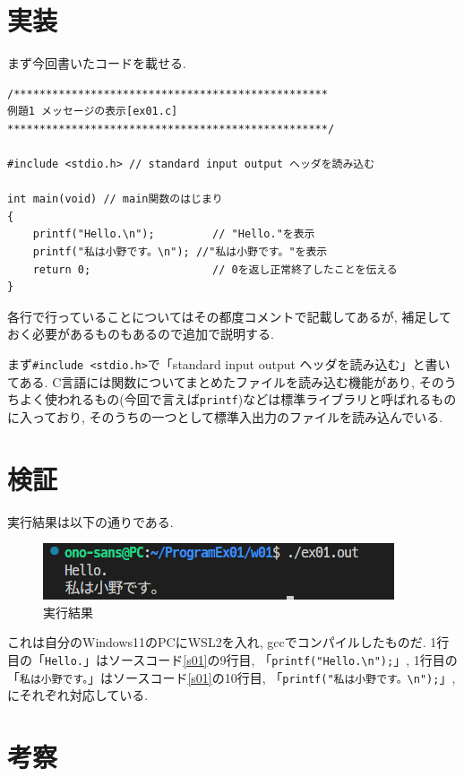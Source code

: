 \documentclass[a4paper, xelatex, ja=standard, 10.5pt]{bxjsarticle}
\begin{document}
\section{実装}
まず今回書いたコードを載せる.
\begin{lstlisting}[caption=ソースコード,label=s01]
/*************************************************
例題1 メッセージの表示[ex01.c]
**************************************************/

#include <stdio.h> // standard input output ヘッダを読み込む

int main(void) // main関数のはじまり
{
    printf("Hello.\n");         // "Hello."を表示
    printf("私は小野です。\n"); //"私は小野です。"を表示
    return 0;                   // 0を返し正常終了したことを伝える
}
\end{lstlisting}
各行で行っていることについてはその都度コメントで記載してあるが,
補足しておく必要があるものもあるので追加で説明する.

まず\texttt{\#include <stdio.h>}で「standard input output ヘッダを読み込む」と書いてある.
C言語には関数についてまとめたファイルを読み込む機能があり,
そのうちよく使われるもの(今回で言えば\texttt{printf})などは標準ライブラリと呼ばれるものに入っており,
そのうちの一つとして標準入出力のファイルを読み込んでいる.

\section{検証}
実行結果は以下の通りである.
\begin{figure}[H]
\centering
\includegraphics[scale=0.7]{img/wsl_result.png}
\caption{実行結果}
\label{result01}
\end{figure}

これは自分のWindows11のPCにWSL2を入れ, gccでコンパイルしたものだ.
1行目の「\texttt{Hello.}」はソースコード\ref{s01}の9行目,
「\texttt{printf("Hello.\textbackslash n");}」,
1行目の「\texttt{私は小野です。}」はソースコード\ref{s01}の10行目,
「\texttt{printf("私は小野です。\textbackslash n");}」,
にそれぞれ対応している.

\section{考察}
\end{document}
